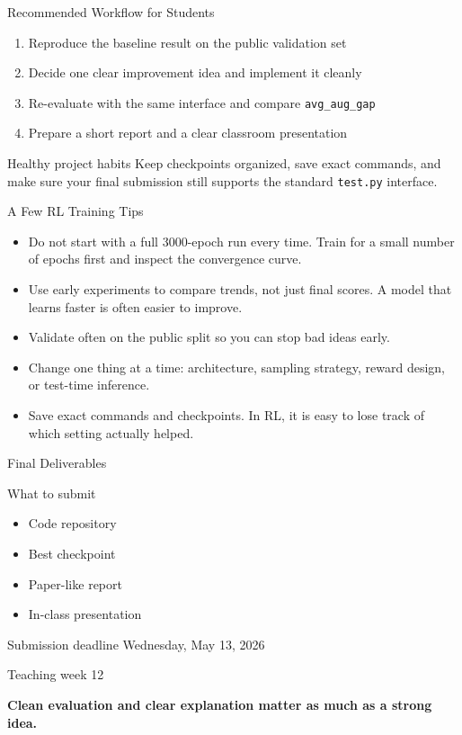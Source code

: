 \documentclass[aspectratio=169,11pt]{beamer}
\begin{document}
\begin{frame}{Recommended Workflow for Students}
  \begin{enumerate}
    \item Reproduce the baseline result on the public validation set
    \item Decide one clear improvement idea and implement it cleanly
    \item Re-evaluate with the same interface and compare \texttt{avg\_aug\_gap}
    \item Prepare a short report and a clear classroom presentation
  \end{enumerate}

  \vspace{0.4cm}
  \begin{block}{Healthy project habits}
    Keep checkpoints organized, save exact commands, and make sure your final submission still supports the standard \texttt{test.py} interface.
  \end{block}
\end{frame}

\begin{frame}{A Few RL Training Tips}
  \begin{itemize}
    \item Do not start with a full 3000-epoch run every time. Train for a small number of epochs first and inspect the convergence curve.
    \item Use early experiments to compare trends, not just final scores. A model that learns faster is often easier to improve.
    \item Validate often on the public split so you can stop bad ideas early.
    \item Change one thing at a time: architecture, sampling strategy, reward design, or test-time inference.
    \item Save exact commands and checkpoints. In RL, it is easy to lose track of which setting actually helped.
  \end{itemize}
\end{frame}

\begin{frame}{Final Deliverables}
  \begin{block}{What to submit}
    \begin{itemize}
      \item Code repository
      \item Best checkpoint
      \item Paper-like report
      \item In-class presentation
    \end{itemize}
  \end{block}

  \begin{alertblock}{Submission deadline}
    Wednesday, May 13, 2026

    Teaching week 12
  \end{alertblock}

  \vspace{0.3cm}
  \centering
  {\Large\color{sdmblue}\textbf{Clean evaluation and clear explanation matter as much as a strong idea.}}
\end{frame}
\end{document}
